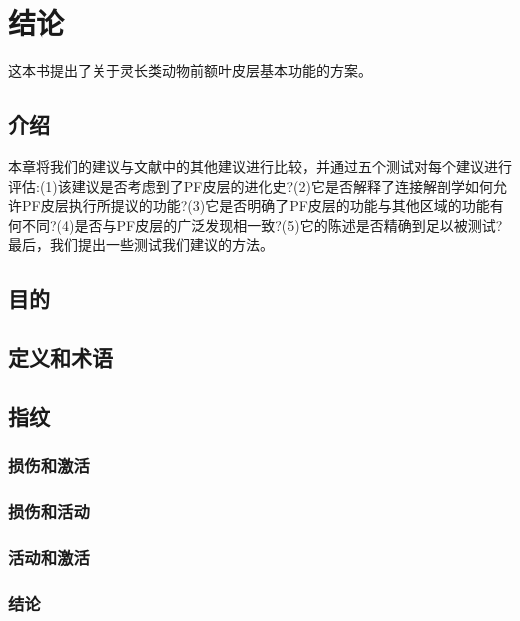 \chapter{结论}
这本书提出了关于灵长类动物前额叶皮层基本功能的方案。

\section{介绍}
    本章将我们的建议与文献中的其他建议进行比较，并通过五个测试对每个建议进行评估:(1)该建议是否考虑到了PF皮层的进化史?(2)它是否解释了连接解剖学如何允许PF皮层执行所提议的功能?(3)它是否明确了PF皮层的功能与其他区域的功能有何不同?(4)是否与PF皮层的广泛发现相一致?(5)它的陈述是否精确到足以被测试?最后，我们提出一些测试我们建议的方法。
\section{目的}

\section{定义和术语}


\section{指纹}

\subsection{损伤和激活}

\subsection{损伤和活动}

\subsection{活动和激活}




\subsection{结论}


